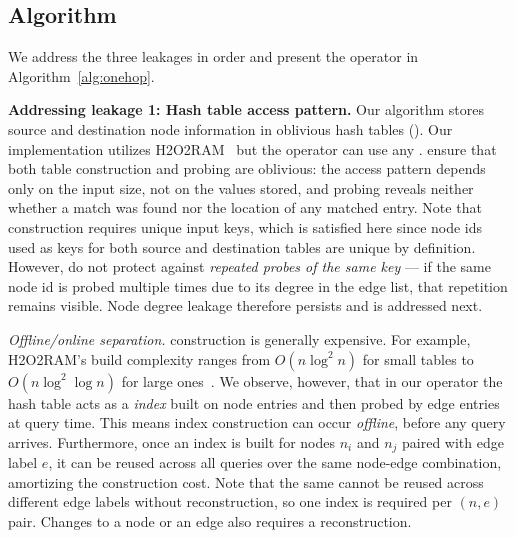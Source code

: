 \subsection{\Onehop Algorithm}
\label{sec:onehop:algorithm}


We address the three leakages in order and present the operator in Algorithm~\ref{alg:onehop}.

\noindent\textbf{Addressing leakage 1: Hash table access pattern.}
Our algorithm stores source and destination node information in oblivious 
hash tables (\ohts). Our implementation utilizes H2O2RAM~\cite{zheng2025h2o2ram}
but the operator can use any \oht.
\ohts ensure that both table construction and probing are oblivious: the 
access pattern depends only on the input size, not on the values stored, and 
probing reveals neither whether a match was found nor the location of any 
matched entry. Note that \oht construction requires unique input keys, which is satisfied 
here since node ids used as keys for both source and destination tables
are unique by definition. However, \ohts do not protect against \emph{repeated probes 
of the same key} --- if the same node id is probed multiple times due to its 
degree in the edge list, that repetition remains visible. Node degree leakage 
therefore persists and is addressed next. 

\noindent\textit{Offline/online separation.}
\oht construction is generally expensive. For example, H2O2RAM's build complexity 
ranges from $O(n\log^2 n)$ for small tables to 
$O(n\log^2\log n)$ for large ones~\cite{zheng2025h2o2ram}. We observe, 
however, that in our operator the hash table acts as a \emph{index}
built on node entries and then probed by edge entries at query time. 
This means index construction can occur \emph{offline}, before any query 
arrives. Furthermore, once an index is built for nodes $n_i$ and $n_j$ 
paired with edge label $e$, it can be reused across all queries over the 
same node-edge combination, amortizing the construction cost. Note that 
the same \oht cannot be reused across different edge labels without 
reconstruction, so one index is required per $(n, e)$ pair. Changes to
a node or an edge also requires a reconstruction.




